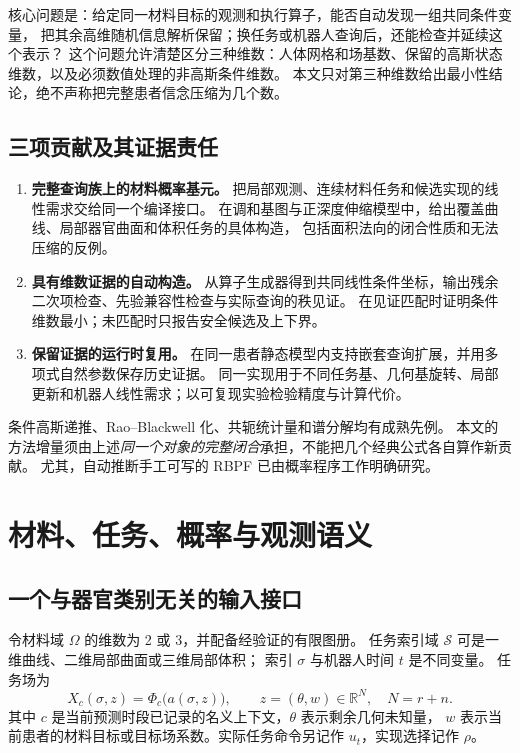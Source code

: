 \documentclass[11pt,a4paper]{article}
\numberwithin{equation}{section}
\theoremstyle{definition}
\newcommand{\R}{\mathbb R}
\begin{document}
核心问题是：给定同一材料目标的观测和执行算子，能否自动发现一组共同条件变量，
把其余高维随机信息解析保留；换任务或机器人查询后，还能检查并延续这个表示？
这个问题允许清楚区分三种维数：人体网格和场基数、保留的高斯状态维数，以及必须数值处理的非高斯条件维数。
本文只对第三种维数给出最小性结论，绝不声称把完整患者信念压缩为几个数。

\subsection{三项贡献及其证据责任}
\begin{enumerate}
\item \textbf{完整查询族上的材料概率基元。}
把局部观测、连续材料任务和候选实现的线性需求交给同一个编译接口。
在调和基图与正深度伸缩模型中，给出覆盖曲线、局部器官曲面和体积任务的具体构造，
包括面积法向的闭合性质和无法压缩的反例。
\item \textbf{具有维数证据的自动构造。}
从算子生成器得到共同线性条件坐标，输出残余二次项检查、先验兼容性检查与实际查询的秩见证。
在见证匹配时证明条件维数最小；未匹配时只报告安全候选及上下界。
\item \textbf{保留证据的运行时复用。}
在同一患者静态模型内支持嵌套查询扩展，并用多项式自然参数保存历史证据。
同一实现用于不同任务基、几何基旋转、局部更新和机器人线性需求；以可复现实验检验精度与计算代价。
\end{enumerate}

条件高斯递推、Rao--Blackwell 化、共轭统计量和谱分解均有成熟先例。
本文的方法增量须由上述\emph{同一个对象的完整闭合}承担，不能把几个经典公式各自算作新贡献。
尤其，自动推断手工可写的 RBPF 已由概率程序工作明确研究\cite{murray2018,atkinson2022,autoconj2018}。

\section{材料、任务、概率与观测语义}
\label{sec:model}

\subsection{一个与器官类别无关的输入接口}
令材料域 \(\Omega\) 的维数为 2 或 3，并配备经验证的有限图册。
任务索引域 \(\mathcal S\) 可是一维曲线、二维局部曲面或三维局部体积；
索引 \(\sigma\) 与机器人时间 \(t\) 是不同变量。
任务场为
\begin{equation}
 X_c(\sigma,z)=\Phi_c\bigl(a(\sigma,z)\bigr),\qquad
 z=(\theta,w)\in\R^{N},\quad N=r+n .
\end{equation}
其中 \(c\) 是当前预测时段已记录的名义上下文，\(\theta\) 表示剩余几何未知量，
\(w\) 表示当前患者的材料目标或目标场系数。实际任务命令另记作 \(u_t\)，实现选择记作 \(\rho\)。
\end{document}
